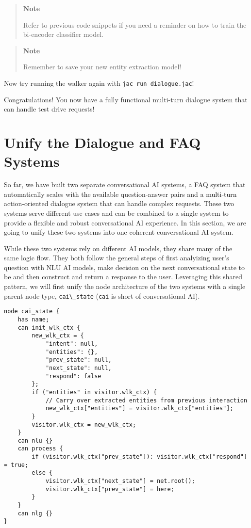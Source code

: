 \begin{quote}
\textbf{Note}

Refer to previous code snippets if you need a reminder on how to train
the bi-encoder classifier model.
\end{quote}

\begin{quote}
\textbf{Note}

Remember to save your new entity extraction model!
\end{quote}

Now try running the walker again with
\passthrough{\lstinline!jac run dialogue.jac!}!

Congratulations! You now have a fully functional multi-turn dialogue
system that can handle test drive requests!

\hypertarget{unify-the-dialogue-and-faq-systems}{%
\section{Unify the Dialogue and FAQ
Systems}\label{unify-the-dialogue-and-faq-systems}}

So far, we have built two separate conversational AI systems, a FAQ
system that automatically scales with the available question-answer
pairs and a multi-turn action-oriented dialogue system that can handle
complex requests. These two systems serve different use cases and can be
combined to a single system to provide a flexible and robust
conversational AI experience. In this section, we are going to unify
these two systems into one coherent conversational AI system.

While these two systems rely on different AI models, they share many of
the same logic flow. They both follow the general steps of first
analyizing user's question with NLU AI models, make decision on the next
conversational state to be and then construct and return a response to
the user. Leveraging this shared pattern, we will first unify the node
architecture of the two systems with a single parent node type,
\passthrough{\lstinline!cai\_state!} (\passthrough{\lstinline!cai!} is
short of conversational AI).

\begin{lstlisting}
node cai_state {
    has name;
    can init_wlk_ctx {
        new_wlk_ctx = {
            "intent": null,
            "entities": {},
            "prev_state": null,
            "next_state": null,
            "respond": false
        };
        if ("entities" in visitor.wlk_ctx) {
            // Carry over extracted entities from previous interaction
            new_wlk_ctx["entities"] = visitor.wlk_ctx["entities"];
        }
        visitor.wlk_ctx = new_wlk_ctx;
    }
    can nlu {}
    can process {
        if (visitor.wlk_ctx["prev_state"]): visitor.wlk_ctx["respond"] = true;
        else {
            visitor.wlk_ctx["next_state"] = net.root();
            visitor.wlk_ctx["prev_state"] = here;
        }
    }
    can nlg {}
}
\end{lstlisting}


